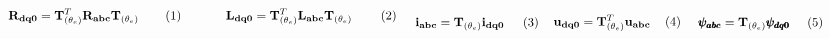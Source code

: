 \begin{subequations}
	\noindent
	\begin{minipage}{.5\linewidth}
		\begin{equation}
			\mathbf{R_{dq0}} = \mathbf{T}^T_{(\theta_e)} \mathbf{R_{abc}}\mathbf{T}_{(\theta_e)}
		\end{equation}
	\end{minipage}%
	\begin{minipage}{.5\linewidth}
		\begin{equation}
			\mathbf{L_{dq0}} = \mathbf{T}^T_{(\theta_e)} \mathbf{L_{abc}}\mathbf{T}_{(\theta_e)}
		\end{equation}
	\end{minipage}%
	\\
	\begin{minipage}{.33\linewidth}
		\begin{equation}
			\mathbf{i_{abc}} = \mathbf{T}_{(\theta_e)} \mathbf{i_{dq0}}
		\end{equation}
	\end{minipage}%
	\begin{minipage}{.33\linewidth}
		\begin{equation}
			\mathbf{u_{dq0}} = \mathbf{T}^T_{(\theta_e)} \mathbf{u_{abc}}
		\end{equation}
	\end{minipage}%
	\begin{minipage}{.33\linewidth}
		\begin{equation}
			\pmb{\psi_{abc}} = \mathbf{T}_{(\theta_e)} \pmb{\psi_{dq0}}
		\end{equation}
	\end{minipage}%
	\label{eq:variables_dq0}
\end{subequations}


